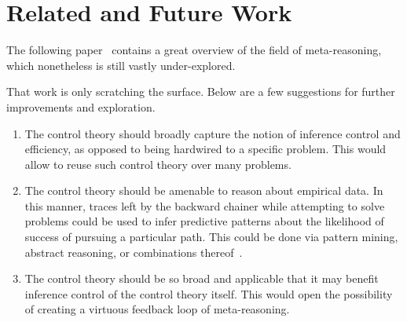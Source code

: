 \documentclass{easychair}
\begin{document}





\section{Related and Future Work}

The following paper~\cite{} contains a great overview of the field of
meta-reasoning, which nonetheless is still vastly under-explored.

That work is only scratching the surface.  Below are a few suggestions
for further improvements and exploration.
\begin{enumerate}
\item The control theory should broadly capture the notion of
  inference control and efficiency, as opposed to being hardwired to a
  specific problem.  This would allow to reuse such control theory
  over many problems.
\item The control theory should be amenable to reason about empirical
  data.  In this manner, traces left by the backward chainer while
  attempting to solve problems could be used to infer predictive
  patterns about the likelihood of success of pursuing a particular
  path.  This could be done via pattern mining, abstract reasoning, or
  combinations thereof~\cite{TODO}.
\item The control theory should be so broad and applicable that it may
  benefit inference control of the control theory itself.  This would
  open the possibility of creating a virtuous feedback loop of
  meta-reasoning.
\end{enumerate}
\end{document}
